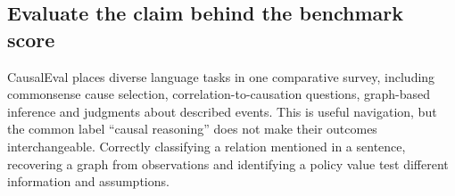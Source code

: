 \hypertarget{evaluate-the-claim-behind-the-benchmark-score}{%
\subsection{Evaluate the claim behind the benchmark
score}\label{evaluate-the-claim-behind-the-benchmark-score}}

\label{exec13:census-evaluation}

CausalEval places diverse language tasks in one comparative survey,
including commonsense cause selection, correlation-to-causation
questions, graph-based inference and judgments about described events.
This is useful navigation, but the common label ``causal reasoning''
does not make their outcomes interchangeable. Correctly classifying a
relation mentioned in a sentence, recovering a graph from observations
and identifying a policy value test different information and
assumptions. \citep{exec13_census_causaleval}


